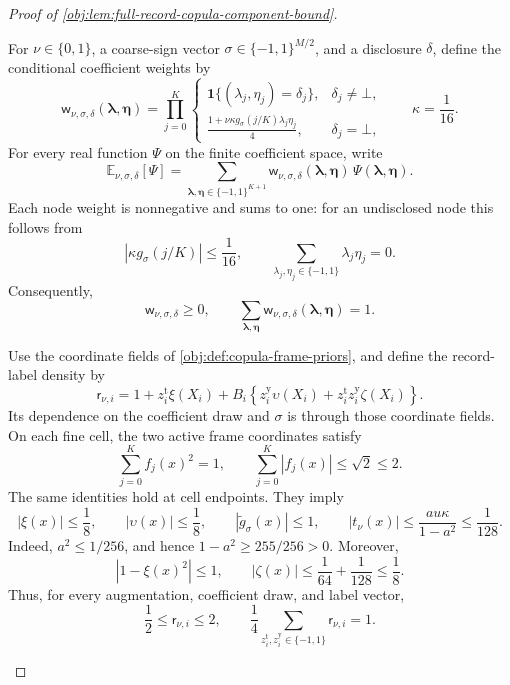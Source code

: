 \begin{proof}[Proof of \cref{obj:lem:full-record-copula-component-bound}]
\begin{enumerate}
For \(\nu\in\{0,1\}\), a coarse-sign vector
\(\sigma\in\{-1,1\}^{M/2}\), and a disclosure \(\delta\), define the conditional coefficient weights by
\[
\mathsf w_{\nu,\sigma,\delta}
 (\boldsymbol\lambda,\boldsymbol\eta)
 =
 \prod_{j=0}^{K}
 \begin{cases}
 \mathbf1\{(\lambda_j,\eta_j)=\delta_j\},&\delta_j\ne\bot,\\[2pt]
 \displaystyle
 \frac{1+\nu\kappa g_\sigma(j/K)\lambda_j\eta_j}{4},
 &\delta_j=\bot,
 \end{cases}
\qquad \kappa=\frac1{16}.
\]
For every real function \(\Psi\) on the finite coefficient space, write
\[
\mathbb E_{\nu,\sigma,\delta}[\Psi]
 =
 \sum_{\boldsymbol\lambda,\boldsymbol\eta\in\{-1,1\}^{K+1}}
 \mathsf w_{\nu,\sigma,\delta}
 (\boldsymbol\lambda,\boldsymbol\eta)\,
 \Psi(\boldsymbol\lambda,\boldsymbol\eta).
\]
Each node weight is nonnegative and sums to one: for an undisclosed node this follows from
\[
|\kappa g_\sigma(j/K)|\le\frac1{16},
\qquad
\sum_{\lambda_j,\eta_j\in\{-1,1\}}\lambda_j\eta_j=0.
\]
Consequently,
\[
\mathsf w_{\nu,\sigma,\delta}\ge0,
\qquad
\sum_{\boldsymbol\lambda,\boldsymbol\eta}
 \mathsf w_{\nu,\sigma,\delta}
 (\boldsymbol\lambda,\boldsymbol\eta)=1.
\]

Use the coordinate fields of \cref{obj:def:copula-frame-priors}, and define the record-label density by
\[
\mathsf r_{\nu,i}
 =
 1+z_i^{\mathrm t}\xi(X_i)
 +B_i\left\{
 z_i^{\mathrm y}\upsilon(X_i)
 +z_i^{\mathrm t}z_i^{\mathrm y}\zeta(X_i)
 \right\}.
\]
Its dependence on the coefficient draw and \(\sigma\) is through those coordinate fields. On each fine cell, the two active frame coordinates satisfy
\[
\sum_{j=0}^{K}f_j(x)^2=1,
\qquad
\sum_{j=0}^{K}|f_j(x)|\le\sqrt2\le2.
\]
The same identities hold at cell endpoints. They imply
\[
|\xi(x)|\le\frac18,
\qquad
|\upsilon(x)|\le\frac18,
\qquad
|\widetilde g_\sigma(x)|\le1,
\qquad
|t_\nu(x)|
 \le\frac{au\kappa}{1-a^2}\le\frac1{128}.
\]
Indeed, \(a^2\le1/256\), and hence \(1-a^2\ge255/256>0\). Moreover,
\[
|1-\xi(x)^2|\le1,
\qquad
|\zeta(x)|
 \le\frac1{64}+\frac1{128}\le\frac18.
\]
Thus, for every augmentation, coefficient draw, and label vector,
\[
\frac12\le\mathsf r_{\nu,i}\le2,
\qquad
\frac14\sum_{z_i^{\mathrm t},z_i^{\mathrm y}\in\{-1,1\}}
 \mathsf r_{\nu,i}=1.
\]


\end{enumerate}
\end{proof}
